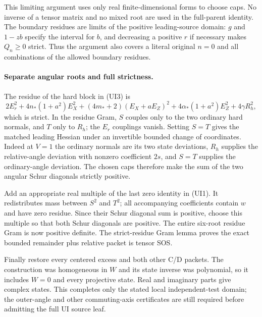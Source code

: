 This limiting argument uses only real finite-dimensional forms to
choose caps. No inverse of a tensor matrix and no mixed root are
used in the full-parent identity. The boundary residues are limits
of the positive leading-source domain: $g$ and $1-zb$ specify the
interval for $b$, and decreasing a positive $r$ if necessary makes
$Q_n\ge0$ strict. Thus the argument also covers a literal original
$n=0$ and all combinations of the allowed boundary residues.

\paragraph{Separate angular roots and full strictness.}
The residue of the hard block in (UI3) is
\[
 2E_r^2+4n_*(1+a^2)E_X^2
 +(4m_*+2)(E_X+aE_Z)^2+4\alpha_*(1+a^2)E_Z^2
 +4\gamma R_h^2,
\]
which is strict. In the residue Gram, $S$ couples only to the two
ordinary hard normals, and $T$ only to $R_h$; the $E_r$ couplings
vanish. Setting $S=T$ gives the matched leading Hessian under an
invertible bounded change of coordinates. Indeed at $V=1$ the
ordinary normals are its two state deviations, $R_h$ supplies the
relative-angle deviation with nonzero coefficient $2s$, and
$S=T$ supplies the ordinary-angle deviation. The chosen caps therefore
make the sum of the two angular Schur diagonals strictly positive.

Add an appropriate real multiple of the last zero identity in (UI1).
It redistributes mass between $S^2$ and $T^2$; all accompanying
coefficients contain $w$ and have zero residue. Since their Schur
diagonal sum is positive, choose this multiple so that both Schur
diagonals are positive. The entire six-root residue Gram is now
positive definite. The strict-residue Gram lemma proves the exact
bounded remainder plus relative packet is tensor SOS.

Finally restore every centered excess and both other C/D packets.
The construction was homogeneous in $W$ and its state inverse was
polynomial, so it includes $W=0$ and every projective state. Real and
imaginary parts give complex states. This completes only the stated
local independent-test domain; the outer-angle and other commuting-axis
certificates are still required before admitting the full UI source leaf.

